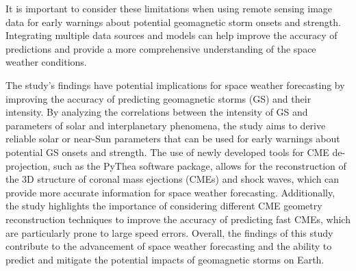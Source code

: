 It is important to consider these limitations when using remote sensing image data for early warnings about potential geomagnetic storm onsets and strength. Integrating multiple data sources and models can help improve the accuracy of predictions and provide a more comprehensive understanding of the space weather conditions.

The study's findings have potential implications for space weather forecasting by improving the accuracy of predicting geomagnetic storms (GS) and their intensity. By analyzing the correlations between the intensity of GS and parameters of solar and interplanetary phenomena, the study aims to derive reliable solar or near-Sun parameters that can be used for early warnings about potential GS onsets and strength. The use of newly developed tools for CME de-projection, such as the PyThea software package, allows for the reconstruction of the 3D structure of coronal mass ejections (CMEs) and shock waves, which can provide more accurate information for space weather forecasting. Additionally, the study highlights the importance of considering different CME geometry reconstruction techniques to improve the accuracy of predicting fast CMEs, which are particularly prone to large speed errors. Overall, the findings of this study contribute to the advancement of space weather forecasting and the ability to predict and mitigate the potential impacts of geomagnetic storms on Earth.

